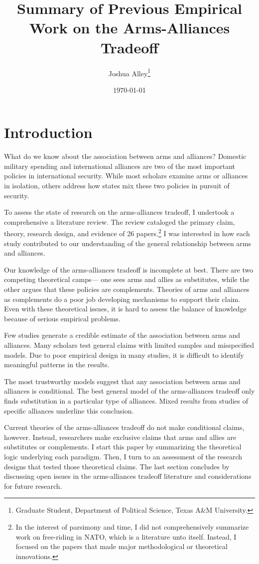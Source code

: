 \documentclass[12pt]{article}
\title{\textbf{Summary of Previous Empirical Work on the Arms-Alliances Tradeoff}}
\author{Joshua Alley\footnote{Graduate Student,
Department of Political Science, Texas A\&M University.}}
\date{{\normalsize \today}}
\begin{document}
\maketitle 


\section*{Introduction}

What do we know about the association between arms and alliances? Domestic military spending and international alliances are two of the most important policies in international security. While most scholars examine arms or alliances in isolation, others address how states mix these two policies in pursuit of security. 

To assess the state of research on the arms-alliances tradeoff, I undertook a comprehensive a literature review. The review cataloged the primary claim, theory, research design, and evidence of 26 papers.\footnote{In the interest of parsimony and time, I did not comprehensively summarize work on free-riding in NATO, which is a literature unto itself. Instead, I focused on the papers that made major methodological or theoretical innovations.} I was interested in how each study contributed to our understanding of the general relationship between arms and alliances. 

Our knowledge of the arms-alliances tradeoff is incomplete at best. There are two competing theoretical camps--- one sees arms and allies as substitutes, while the other argues that these policies are complements. Theories of arms and alliances as complements do a poor job developing mechanisms to support their claim. Even with these theoretical issues, it is hard to assess the balance of knowledge because of serious empirical problems. 

Few studies generate a credible estimate of the association between arms and alliances. Many scholars test general claims with limited samples and misspecified models. Due to poor empirical design in many studies, it is difficult to identify meaningful patterns in the results. 

The most trustworthy models suggest that any association between arms and alliances is conditional. The best general model of the arms-alliances tradeoff only finds substitution in a particular type of alliances. Mixed results from studies of specific alliances underline this conclusion. 

Current theories of the arms-alliances tradeoff do not make conditional claims, however. Instead, researchers make exclusive claims that arms and allies are substitutes or complements. I start this paper by summarizing the theoretical logic underlying each paradigm. Then, I turn to an assessment of the research designs that tested those theoretical claims. The last section concludes by discussing open issues in the arms-alliances tradeoff literature and considerations for future research. 
\end{document}
